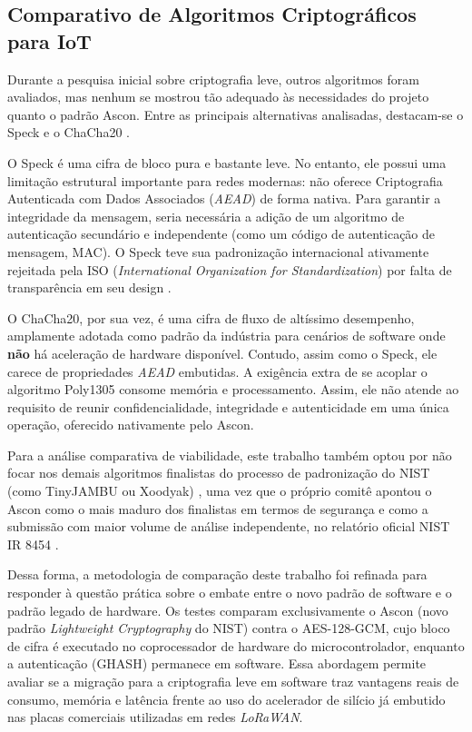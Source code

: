 
\subsection{Comparativo de Algoritmos Criptográficos para IoT}
Durante a pesquisa inicial sobre criptografia leve, outros algoritmos foram avaliados, mas nenhum se mostrou tão adequado às necessidades do projeto quanto o padrão Ascon. Entre as principais alternativas analisadas, destacam-se o Speck \cite{beaulieu2013speck} e o ChaCha20 \cite{bernstein2008chacha}.

O Speck é uma cifra de bloco pura e bastante leve. No entanto, ele possui uma limitação estrutural importante para redes modernas: não oferece Criptografia Autenticada com Dados Associados (\textit{AEAD}) de forma nativa. Para garantir a integridade da mensagem, seria necessária a adição de um algoritmo de autenticação secundário e independente (como um código de autenticação de mensagem, MAC). O Speck teve sua padronização internacional ativamente rejeitada pela ISO (\textit{International Organization for Standardization}) por falta de transparência em seu design \cite{register2018nsa}.

O ChaCha20, por sua vez, é uma cifra de fluxo de altíssimo desempenho, amplamente adotada como padrão da indústria para cenários de software onde \textbf{não} há aceleração de hardware disponível. Contudo, assim como o Speck, ele carece de propriedades \textit{AEAD} embutidas. A exigência extra de se acoplar o algoritmo Poly1305 consome memória e processamento. Assim, ele não atende ao requisito de reunir confidencialidade, integridade e autenticidade em uma única operação, oferecido nativamente pelo Ascon.

Para a análise comparativa de viabilidade, este trabalho também optou por não focar nos demais algoritmos finalistas do processo de padronização do NIST (como TinyJAMBU ou Xoodyak) \cite{nist_lwc_finalists}, uma vez que o próprio comitê apontou o Ascon como o mais maduro dos finalistas em termos de segurança e como a submissão com maior volume de análise independente, no relatório oficial NIST IR 8454 \cite{nistir8454}.

Dessa forma, a metodologia de comparação deste trabalho foi refinada para responder à questão prática sobre o embate entre o novo padrão de software e o padrão legado de hardware. Os testes comparam exclusivamente o Ascon (novo padrão \textit{Lightweight Cryptography} do NIST) contra o AES-128-GCM, cujo bloco de cifra é executado no coprocessador de hardware do microcontrolador, enquanto a autenticação (GHASH) permanece em software. Essa abordagem permite avaliar se a migração para a criptografia leve em software traz vantagens reais de consumo, memória e latência frente ao uso do acelerador de silício já embutido nas placas comerciais utilizadas em redes \textit{LoRaWAN}.

